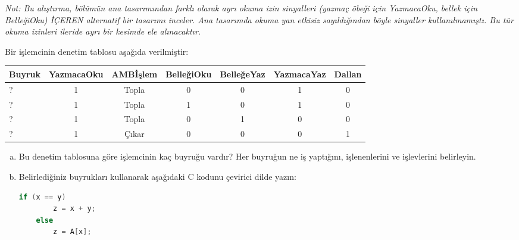 \begin{alistirma}[\orta]
\textit{Not: Bu alıştırma, bölümün ana tasarımından farklı olarak ayrı okuma izin sinyalleri (yazmaç öbeği için YazmacaOku, bellek için BelleğiOku) İÇEREN alternatif bir tasarımı inceler. Ana tasarımda okuma yan etkisiz sayıldığından böyle sinyaller kullanılmamıştı. Bu tür okuma izinleri ileride ayrı bir kesimde ele alınacaktır.}

Bir işlemcinin denetim tablosu aşağıda verilmiştir:

\begin{center}
\small
\begin{tabular}{lcccccc}
\toprule
\textbf{Buyruk} & \textbf{YazmacaOku} & \textbf{AMBİşlem} & \textbf{BelleğiOku} & \textbf{BelleğeYaz} & \textbf{YazmacaYaz} & \textbf{Dallan} \\
\midrule
? & 1 & Topla & 0 & 0 & 1 & 0 \\
? & 1 & Topla & 1 & 0 & 1 & 0 \\
? & 1 & Topla & 0 & 1 & 0 & 0 \\
? & 1 & Çıkar & 0 & 0 & 0 & 1 \\
\bottomrule
\end{tabular}
\end{center}

\begin{enumerate}[(a)]
    \item Bu denetim tablosuna göre işlemcinin kaç buyruğu vardır? Her buyruğun ne iş yaptığını, işlenenlerini ve işlevlerini belirleyin.
    \item Belirlediğiniz buyrukları kullanarak aşağıdaki C kodunu çevirici dilde yazın:
\begin{lstlisting}[language=C, style=alistirma-kod]
    if (x == y)
        z = x + y;
    else
        z = A[x];
\end{lstlisting}
\end{enumerate}
\end{alistirma}

